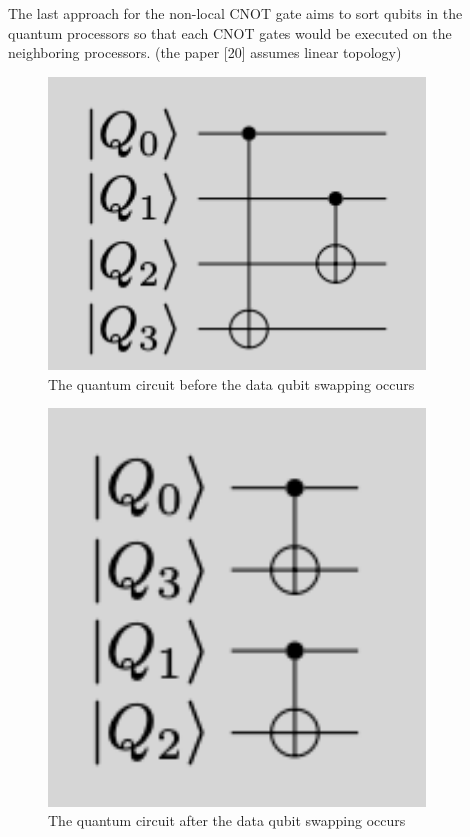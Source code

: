 The last approach for the non-local CNOT gate aims to sort qubits in the quantum processors so that each CNOT gates would be executed on the neighboring processors. (the paper [20] assumes linear topology)

\begin{figure}[h]
  		\begin{center}
  			\includegraphics[width=10cm]{img/data-swapping-before.png}
			\caption{The quantum circuit before the data qubit swapping occurs}
			\label{Fig3}
		\end{center}
	\end{figure}
	
\begin{figure}[h]
  		\begin{center}
  			\includegraphics[width=10cm]{img/data-swapping-after.png}
			\caption{The quantum circuit after the data qubit swapping occurs}
			\label{Fig3}
		\end{center}
	\end{figure}
\newpage

